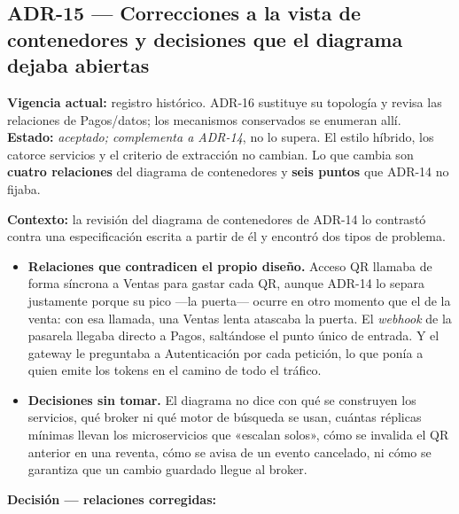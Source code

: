 
\subsection*{ADR-15 --- Correcciones a la vista de contenedores y decisiones que el diagrama dejaba abiertas}

\textbf{Vigencia actual:} registro histórico. ADR-16 sustituye su topología y revisa las relaciones de Pagos/datos; los mecanismos conservados se enumeran allí.\\
\textbf{Estado:} \textit{aceptado; complementa a ADR-14}, no lo supera. El estilo
híbrido, los catorce servicios y el criterio de extracción no cambian. Lo que
cambia son \textbf{cuatro relaciones} del diagrama de contenedores y
\textbf{seis puntos} que ADR-14 no fijaba.

\textbf{Contexto:} la revisión del diagrama de contenedores de ADR-14 lo
contrastó contra una especificación escrita a partir de él y encontró dos tipos
de problema.

\begin{itemize}
  \item \textbf{Relaciones que contradicen el propio diseño.} Acceso QR llamaba
        de forma síncrona a Ventas para gastar cada QR, aunque ADR-14 lo separa
        justamente porque su pico ---la puerta--- ocurre en otro momento que el
        de la venta: con esa llamada, una Ventas lenta atascaba la puerta. El
        \textit{webhook} de la pasarela llegaba directo a Pagos, saltándose el
        punto único de entrada. Y el gateway le preguntaba a Autenticación por
        cada petición, lo que ponía a quien emite los tokens en el camino de
        todo el tráfico.
  \item \textbf{Decisiones sin tomar.} El diagrama no dice con qué se construyen
        los servicios, qué broker ni qué motor de búsqueda se usan, cuántas
        réplicas mínimas llevan los microservicios que «escalan solos», cómo se
        invalida el QR anterior en una reventa, cómo se avisa de un evento
        cancelado, ni cómo se garantiza que un cambio guardado llegue al broker.
\end{itemize}

\textbf{Decisión --- relaciones corregidas:}

